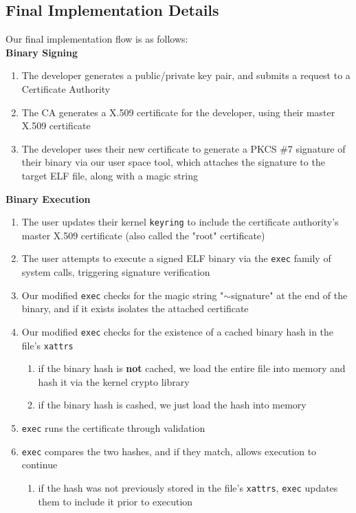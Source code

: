 \documentclass[12pt, letterpaper]{report}
\begin{document}
	\subsection{Final Implementation Details}
	Our final implementation flow is as follows:\\ 
	
	\textbf{Binary Signing}
	\begin{enumerate}
		\item{The developer generates a public/private key pair, and submits a request to a Certificate Authority}
		\item{The CA generates a X.509 certificate for the developer, using their master X.509 certificate}
		\item{The developer uses their new certificate to generate a PKCS \#7 signature of their binary via our user space tool, which attaches the signature to the target ELF file, along with a magic string}
	\end{enumerate}
	
	\textbf{Binary Execution}
	\begin{enumerate}
		\item{The user updates their kernel \texttt{keyring} to include the certificate authority's master X.509 certificate (also called the "root" certificate)}
		\item{The user attempts to execute a signed ELF binary via the \texttt{exec} family of system calls, triggering signature verification}
		\item{Our modified \texttt{exec} checks for the magic string "$\sim$signature" at the end of the binary, and if it exists isolates the attached certificate}
		\item{Our modified \texttt{exec} checks for the existence of a cached binary hash in the file's \texttt{xattrs} }
			\begin{enumerate}
				\item{if the binary hash is \textbf{not} cached, we load the entire file into memory and hash it via the kernel crypto library}
				\item{if the binary hash is cashed, we just load the hash into memory}
			\end{enumerate}
		\item{\texttt{exec} runs the certificate through validation}
		\item{\texttt{exec} compares the two hashes, and if they match, allows execution to continue}
			\begin{enumerate}
				\item{if the hash was not previously stored in the file's \texttt{xattrs}, \texttt{exec} updates them to include it prior to execution}
			\end{enumerate}
	\end{enumerate}
\end{document}
